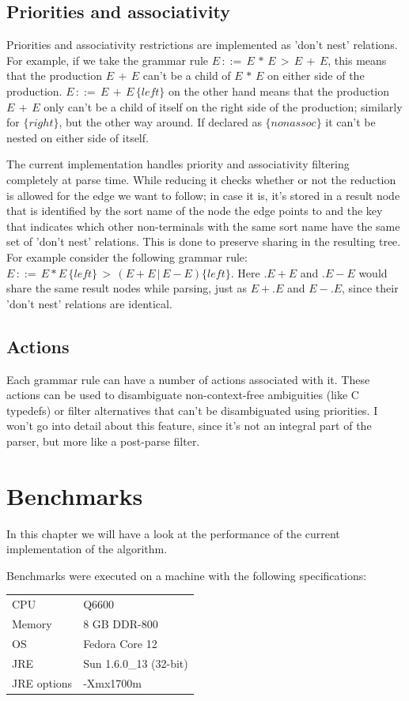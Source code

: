 \documentclass[a4paper,10pt]{article}
\begin{document}
\subsection{Priorities and associativity}

Priorities and associativity restrictions are implemented as 'don't nest' relations. For example, if we take the grammar rule $E\,::=\,E\,*\,E\,>\,E\,+\,E$, this means that the production $E\,+\,E$ can't be a child of $E\,*\,E$ on either side of the production. $E\,::=\,E\,+\,E\,\{left\}$ on the other hand means that the production $E\,+\,E$ only can't be a child of itself on the right side of the production; similarly for $\{right\}$, but the other way around. If declared as $\{nonassoc\}$ it can't be nested on either side of itself.

The current implementation handles priority and associativity filtering completely at parse time. While reducing it checks whether or not the reduction is allowed for the edge we want to follow; in case it is, it's stored in a result node that is identified by the sort name of the node the edge points to and the key that indicates which other non-terminals with the same sort name have the same set of 'don't nest' relations. This is done to preserve sharing in the resulting tree. For example consider the following grammar rule: $E\,::=\,E * E\,\{left\}\,>\,(E + E\,|\,E - E)\{left\}$. Here $.E + E$ and $.E - E$ would share the same result nodes while parsing, just as $E+.E$ and $E-.E$, since their 'don't nest' relations are identical.

\subsection{Actions}

Each grammar rule can have a number of actions associated with it. These actions can be used to disambiguate non-context-free ambiguities (like C typedefs) or filter alternatives that can't be disambiguated using priorities. I won't go into detail about this feature, since it's not an integral part of the parser, but more like a post-parse filter.

\section{Benchmarks}

In this chapter we will have a look at the performance of the current implementation of the algorithm.

Benchmarks were executed on a machine with the following specifications:
\begin{table}[H]
\centering
\begin{tabular}{ | p{6em} | p{9em} | }
 \hline
 CPU & Q6600 \\
 Memory & 8 GB DDR-800 \\
 OS & Fedora Core 12 \\
 JRE & Sun 1.6.0\_13 (32-bit) \\
 JRE options & -Xmx1700m \\
 \hline
\end{tabular}
\end{table}
\end{document}
